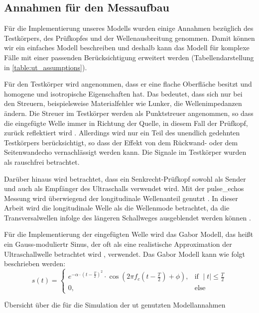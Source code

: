\subsection*{Annahmen für den Messaufbau} \label{sec:UTassumption}
Für die Implementierung unseres Modells wurden einige Annahmen bezüglich des Testkörpers, des Prüfkopfes und der Wellenausbreitung genommen. Damit können wir ein einfaches Modell beschreiben und deshalb kann das Modell für komplexe Fälle mit einer passenden Berücksichtigung erweitert werden (Tabellendarstellung in \ref{table:ut_assumptions}). \par
Für den Testkörper wird angenommen, dass er eine flache Oberfläche besitzt und homogene und isotropische Eigenschaften hat. Das bedeutet, dass sich nur bei den Streuern, beispielsweise Materialfehler wie Lunker, die Wellenimpedanzen ändern. Die Streuer im Testkörper werden als Punktstreuer angenommen, so dass die eingefügte Welle immer in Richtung der Quelle, in diesem Fall der Prüfkopf, zurück reflektiert wird \cite{Krieg15MA}. Allerdings wird nur ein Teil des unendlich gedehnten Testkörpers berücksichtigt, so dass der Effekt von dem Rückwand- oder dem Seitenwandecho vernachlässigt werden kann. Die Signale im Testkörper wurden als rauschfrei betrachtet.\par
Darüber hinaus wird betrachtet, dass ein Senkrecht-Prüfkopf sowohl als Sender und auch als Empfänger des Ultraschalls verwendet wird. Mit der \gls{pulse_echo}s Messung wird überwiegend der longitudinale Wellenanteil genutzt \cite{WSPraktikumUS1}. In dieser Arbeit wird die longitudinale Welle als die Wellenmode betrachtet, da die Transversalwellen infolge des längeren Schallweges ausgeblendet werden können \cite{WSPraktikumUS1}. \par
Für die Implementierung der eingefügten Welle wird das Gabor Modell, das heißt ein Gauss-moduliertr Sinus, der oft als eine realistische Approximation der Ultraschallwelle betrachtet wird \cite{GaborAsymmChirp}, verwendet. Das Gabor Modell kann wie folgt beschrieben werden:
\begin{equation}\label{eq:gabor_pulse}
s(t) = \begin{cases}
				e^{-\alpha \cdot (t - \frac{T}{2})^2} \cdot \cos(2 \pi f_c (t - \frac{T}{2}) + \phi),  & \text{if } \mid t \mid \leq \frac{T}{2} \\
				0, & \text{else}
           \end{cases}
\end{equation}
\begin{table}[h!]
\begin{center}

\caption[\acrshort{ut} Modellannahmen in den Simulationen]{Übersicht über die für die Simulation der \acrshort{ut} genutzten Modellannahmen}
\label{table:ut_assumptions}
\end{center}
\end{table}

